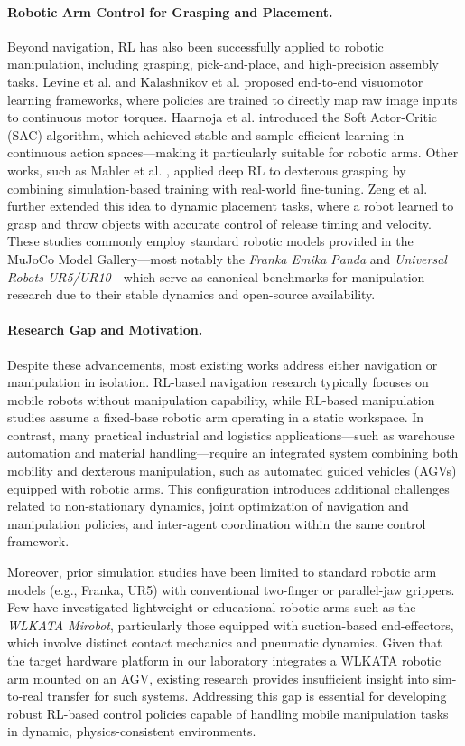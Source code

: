 \documentclass[english, 12pt, a4paper, elec, utf8, a-2b, online]{aaltothesis}
\begin{document}
\paragraph{Robotic Arm Control for Grasping and Placement.}
Beyond navigation, RL has also been successfully applied to robotic manipulation, including grasping, pick-and-place, and high-precision assembly tasks. Levine et al. \cite{levine2018learning} and Kalashnikov et al. \cite{kalashnikov2018scalable} proposed end-to-end visuomotor learning frameworks, where policies are trained to directly map raw image inputs to continuous motor torques. Haarnoja et al. \cite{haarnoja2018soft} introduced the Soft Actor-Critic (SAC) algorithm, which achieved stable and sample-efficient learning in continuous action spaces—making it particularly suitable for robotic arms. Other works, such as Mahler et al. \cite{mahler2019learning}, applied deep RL to dexterous grasping by combining simulation-based training with real-world fine-tuning. Zeng et al. \cite{zeng2020tossingbot} further extended this idea to dynamic placement tasks, where a robot learned to grasp and throw objects with accurate control of release timing and velocity. These studies commonly employ standard robotic models provided in the MuJoCo Model Gallery—most notably the \textit{Franka Emika Panda} and \textit{Universal Robots UR5/UR10}—which serve as canonical benchmarks for manipulation research due to their stable dynamics and open-source availability.

\paragraph{Research Gap and Motivation.}
Despite these advancements, most existing works address either navigation or manipulation in isolation. RL-based navigation research typically focuses on mobile robots without manipulation capability, while RL-based manipulation studies assume a fixed-base robotic arm operating in a static workspace. In contrast, many practical industrial and logistics applications—such as warehouse automation and material handling—require an integrated system combining both mobility and dexterous manipulation, such as automated guided vehicles (AGVs) equipped with robotic arms. This configuration introduces additional challenges related to non-stationary dynamics, joint optimization of navigation and manipulation policies, and inter-agent coordination within the same control framework. 

Moreover, prior simulation studies have been limited to standard robotic arm models (e.g., Franka, UR5) with conventional two-finger or parallel-jaw grippers. Few have investigated lightweight or educational robotic arms such as the \textit{WLKATA Mirobot}, particularly those equipped with suction-based end-effectors, which involve distinct contact mechanics and pneumatic dynamics. Given that the target hardware platform in our laboratory integrates a WLKATA robotic arm mounted on an AGV, existing research provides insufficient insight into sim-to-real transfer for such systems. Addressing this gap is essential for developing robust RL-based control policies capable of handling mobile manipulation tasks in dynamic, physics-consistent environments.
\end{document}
